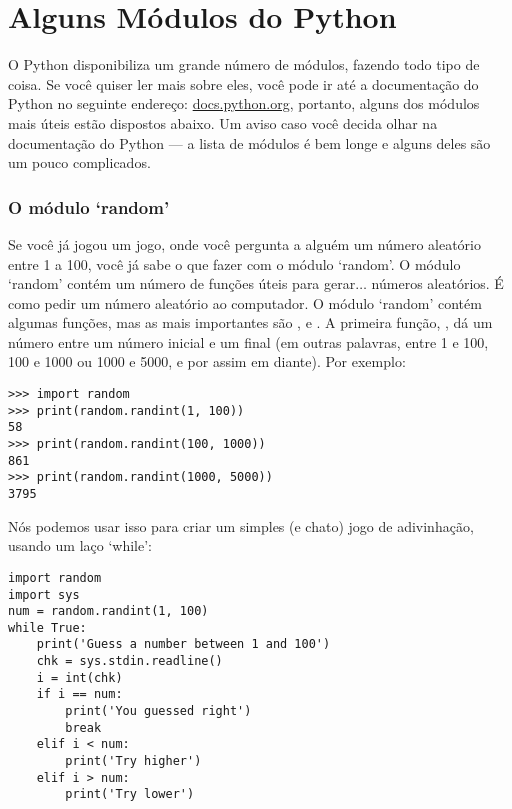 

\chapter{Alguns Módulos do Python}\label{app:afewpythonmodules}

O Python disponibiliza um grande número de módulos, fazendo todo tipo de coisa. Se você quiser ler mais sobre eles, você pode ir até a documentação do Python no seguinte endereço: \href{http://docs.python.org}{docs.python.org}, portanto, alguns dos módulos mais úteis estão dispostos abaixo. Um aviso caso você decida olhar na documentação do Python --- a lista de módulos é bem longe e alguns deles são um pouco complicados.

\subsection*{O módulo `random'}

Se você já jogou um jogo, onde você pergunta a alguém um número aleatório entre 1 a 100, você já sabe o que fazer com o módulo `random'. O módulo `random' contém um número de funções úteis para gerar$\ldots$ números aleatórios. É como pedir um número aleatório ao computador. O módulo `random' contém algumas funções, mas as mais importantes são ,  e . A primeira função, , dá um número entre um número inicial e um final (em outras palavras, entre 1 e 100, 100 e 1000 ou 1000 e 5000, e por assim em diante). Por exemplo:

\begin{listingignore}
\begin{verbatim}
>>> import random
>>> print(random.randint(1, 100))
58
>>> print(random.randint(100, 1000))
861
>>> print(random.randint(1000, 5000))
3795
\end{verbatim}
\end{listingignore}

Nós podemos usar isso para criar um simples (e chato) jogo de adivinhação, usando um laço `while':

\begin{listingignore}
\begin{verbatim}
import random
import sys
num = random.randint(1, 100)
while True:
    print('Guess a number between 1 and 100')
    chk = sys.stdin.readline()
    i = int(chk)
    if i == num:
        print('You guessed right')
        break
    elif i < num:
        print('Try higher')
    elif i > num:
        print('Try lower')
\end{verbatim}
\end{listingignore}

